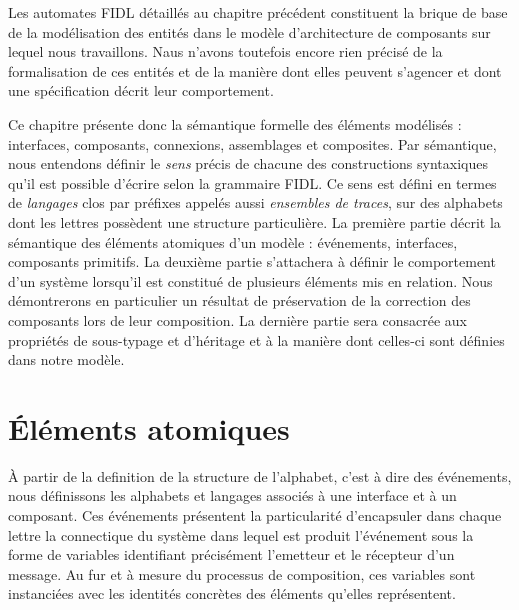 
Les automates FIDL  d\'etaill\'es au chapitre pr\'ec\'edent
constituent la brique de base de la mod\'elisation des entit\'es
dans le mod\`ele d'architecture de composants sur lequel nous
travaillons. Naus n'avons toutefois encore rien pr\'ecis\'e de la
formalisation de ces entit\'es et de la mani\`ere dont elles peuvent
s'agencer et dont une sp\'ecification d\'ecrit leur comportement.   

Ce chapitre pr\'esente donc la s\'emantique formelle des
\'el\'ements mod\'elis\'es : interfaces, composants, connexions,
assemblages et composites. Par s\'emantique, nous entendons
d\'efinir le \emph{sens}  pr\'ecis de chacune des constructions
syntaxiques qu'il est possible d'\'ecrire selon la grammaire
\textsf{FIDL}. Ce sens est d\'efini en termes de \emph{langages} clos
par pr\'efixes appel\'es aussi \emph{ensembles de traces}, sur des alphabets dont
les lettres poss\`edent une structure particuli\`ere. La premi\`ere
partie d\'ecrit la s\'emantique des \'el\'ements atomiques d'un
mod\`ele : \'ev\'enements, interfaces, composants primitifs. La
deuxi\`eme partie s'attachera \`a d\'efinir le comportement d'un
syst\`eme lorsqu'il est constitu\'e de plusieurs \'el\'ements mis
en relation. Nous d\'emontrerons en particulier un r\'esultat de
pr\'eservation de la correction des composants lors de leur
composition. La derni\`ere partie sera consacr\'ee aux propri\'et\'es
de sous-typage et d'h\'eritage et \`a la mani\`ere dont celles-ci
sont d\'efinies dans notre mod\`ele.
  
\section{\'El\'ements atomiques}
\label{section-semantique}

\`A partir de la definition de la structure de l'alphabet, c'est \`a
dire des \'ev\'enements, 
nous d\'efinissons les alphabets et langages associ\'es \`a une
interface et \`a un composant. Ces \'ev\'enements pr\'esentent la
particularit\'e  d'encapsuler dans chaque lettre la
connectique du syst\`eme dans lequel est produit l'\'ev\'enement
sous la forme de variables identifiant pr\'ecis\'ement l'emetteur
et le r\'ecepteur d'un message. Au fur et \`a mesure du processus de
composition, ces variables sont instanci\'ees avec les identit\'es
concr\`etes des \'el\'ements qu'elles repr\'esentent.


